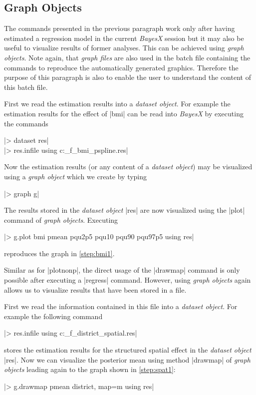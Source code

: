 \subsection{Graph Objects}

The commands presented in the previous paragraph work only after having estimated a regression model in the current {\it
BayesX} session but it may also be useful to visualize results of former analyses. This can be achieved using {\it graph
objects}. Note again, that {\it graph files} are also used in the batch file containing the commands to reproduce the
automatically generated graphics. Therefore the purpose of this paragraph is also to enable the user to understand the content
of this batch file.

First we read the estimation results into a {\it dataset object}. For example the estimation results for the effect of |bmi|
can be read into {\it BayesX} by executing the commands

|> dataset res|\\
|> res.infile using c:\data\s_f_bmi_pspline.res|

Now the estimation results (or any content of a {\it dataset object}) may be visualized using a {\it graph object} which we
create by typing

|> graph g|

The results stored in the {\it dataset object} |res| are now visualized using the |plot| command of {\it graph objects}.
Executing

|> g.plot bmi pmean pqu2p5 pqu10 pqu90 pqu97p5 using res|

reproduces the graph in \ref{step:bmi1}.

Similar as for |plotnonp|, the direct usage of the |drawmap| command is only possible after executing a |regress| command.
However, using {\it graph objects} again allows us to visualize results that have been stored in a file.

First we read the information contained in this file into a {\it dataset object}. For example the following command

|> res.infile using c:\data\s_f_district_spatial.res|

stores the estimation results for the structured spatial effect in the {\it dataset object} |res|. Now we can visualize the
posterior mean using method |drawmap| of {\it graph objects} leading again to the graph shown in \ref{step:spat1}:

|> g.drawmap pmean district, map=m using res|

